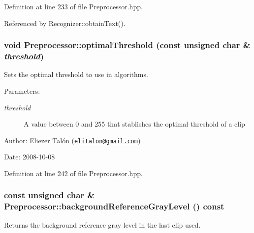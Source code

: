 Definition at line 233 of file Preprocessor.hpp.

Referenced by Recognizer::obtainText().\hypertarget{class_preprocessor_1fc44d7d19944f3c3addd3a576c37414}{
\subsubsection[optimalThreshold]{\setlength{\rightskip}{0pt plus 5cm}void Preprocessor::optimalThreshold (const unsigned char \& {\em threshold})}}
\label{class_preprocessor_1fc44d7d19944f3c3addd3a576c37414}


Sets the optimal threshold to use in algorithms. 

\begin{Desc}
\item[Parameters:]
\begin{description}
\item[{\em threshold}]A value between 0 and 255 that stablishes the optimal threshold of a clip\end{description}
\end{Desc}
\begin{Desc}
\item[Author:]Eliezer Talón (\href{mailto:elitalon@gmail.com}{\tt elitalon@gmail.com}) \end{Desc}
\begin{Desc}
\item[Date:]2008-10-08 \end{Desc}


Definition at line 242 of file Preprocessor.hpp.\hypertarget{class_preprocessor_b435116619b7b254d9e788476c012e8a}{
\subsubsection[backgroundReferenceGrayLevel]{\setlength{\rightskip}{0pt plus 5cm}const unsigned char \& Preprocessor::backgroundReferenceGrayLevel () const}}
\label{class_preprocessor_b435116619b7b254d9e788476c012e8a}


Returns the background reference gray level in the last clip used. 

